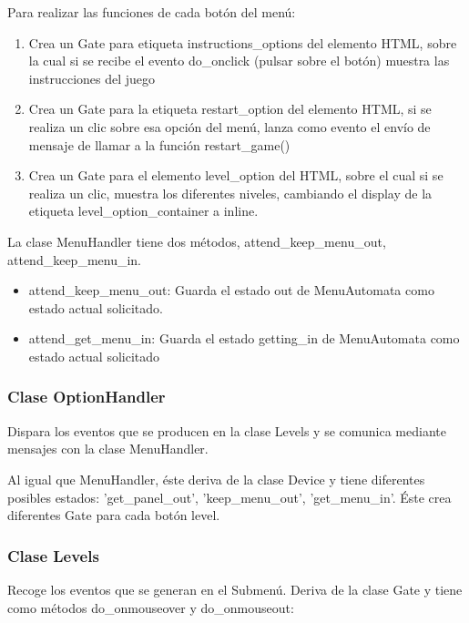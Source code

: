 Para realizar las funciones de cada botón del menú:
\begin{enumerate}
 \item Crea un Gate  para etiqueta instructions\_options del elemento HTML, sobre la cual si se recibe el 
evento do\_onclick (pulsar sobre el botón) muestra las instrucciones del juego

 \item Crea un Gate para la etiqueta restart\_option del elemento HTML, si se realiza un clic sobre esa opción del menú, lanza como evento el envío 
de mensaje de llamar a la función restart\_game()

 \item Crea un Gate para el elemento level\_option del HTML, sobre el cual si se realiza un clic,
muestra los diferentes niveles, cambiando el display de la etiqueta level\_option\_container a inline.
\end{enumerate}

La clase MenuHandler tiene dos métodos, attend\_keep\_menu\_out, attend\_keep\_menu\_in.
\begin{itemize}
 \item attend\_keep\_menu\_out: Guarda el estado out de MenuAutomata como estado actual solicitado.

 \item attend\_get\_menu\_in: Guarda el estado getting\_in de MenuAutomata como estado actual solicitado
\end{itemize}

\subsubsection{Clase OptionHandler}
\label{subsubsection:option_handler}

Dispara los eventos que se producen en la clase Levels y se comunica mediante mensajes con la clase MenuHandler.

Al igual que MenuHandler, éste deriva de la clase Device  y tiene diferentes posibles estados:
'get\_panel\_out', 'keep\_menu\_out', 'get\_menu\_in'.
Éste crea diferentes Gate para cada botón level.


\subsubsection{Clase Levels}
\label{subsubsection:levels}

Recoge los eventos que se generan en el Submenú. 
Deriva de la clase Gate y tiene como métodos do\_onmouseover y do\_onmouseout:

